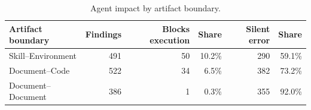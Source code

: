 \begin{table}[t]
  \centering
  \caption{Agent impact by artifact boundary.}
  \label{tab:rq1-boundary-impact}
  \small
  \setlength{\tabcolsep}{4pt}

  \begin{tabular}{lrrrrr}
    \toprule
    Artifact boundary & Findings & Blocks execution & Share & Silent error & Share \\
    \midrule
    Skill–Environment & 491 & 50 & 10.2\% & 290 & 59.1\% \\
    Document–Code & 522 & 34 & 6.5\% & 382 & 73.2\% \\
    Document–Document & 386 & 1 & 0.3\% & 355 & 92.0\% \\
    \bottomrule
  \end{tabular}
\end{table}
